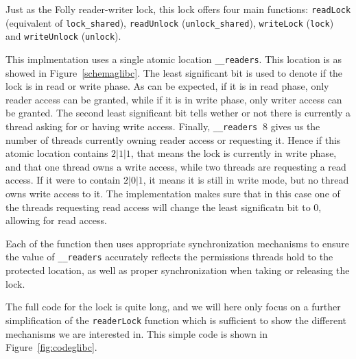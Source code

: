 Just as the Folly reader-writer lock, this lock offers four main functions: \texttt{readLock} (equivalent of \texttt{lock\_shared}), \texttt{readUnlock} (\texttt{unlock\_shared}), \texttt{writeLock} (\texttt{lock}) and \texttt{writeUnlock} (\texttt{unlock}).

This implmentation uses a single atomic location \texttt{\_\_readers}. This location is as showed in Figure~\ref{schemaglibc}. The least significant bit is used to denote if the lock is in read or write phase. As can be expected, if it is in read phase, only reader access can be granted, while if it is in write phase, only writer access can be granted. The second least significant bit tells wether or not there is currently a thread asking for or having write access. Finally, \texttt{\_\_readers} $\ 8$ gives us the number of threads currently owning reader access or requesting it. Hence if this atomic location contains $2 | 1 | 1$, that means the lock is currently in write phase, and that one thread owns a write access, while two threads are requesting a read access. If it were to contain $2 | 0 | 1$, it means it is still in write mode, but no thread owns write access to it. The implementation makes sure that in this case one of the threads requesting read access will change the least significatn bit to $0$, allowing for read access.

Each of the function then uses appropriate synchronization mechanisms to ensure the value of \texttt{\_\_readers} accurately reflects the permissions threads hold to the protected location, as well as proper synchronization when taking or releasing the lock.

The full code for the lock is quite long, and we will here only focus on a further simplification of the \texttt{readerLock} function which is sufficient to show the different mechanisms we are interested in. 
This simple code is shown in Figure~\ref{fig:codeglibc}.

